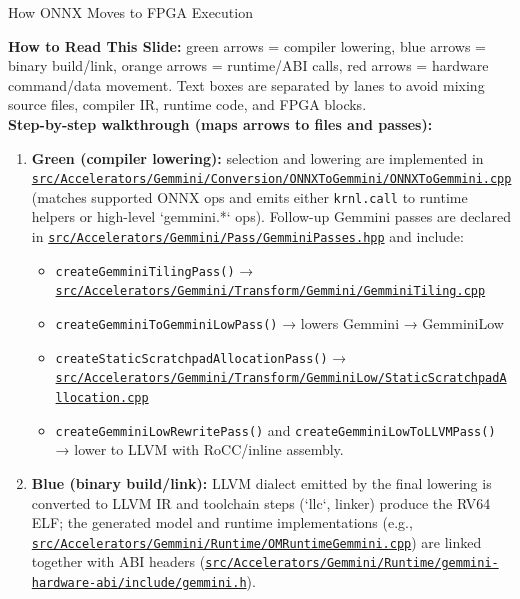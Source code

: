 \documentclass[aspectratio=169,10pt]{beamer}
\newcommand{\code}[1]{\texttt{\footnotesize #1}}
\newcommand{\tinycode}[1]{\texttt{\tiny #1}}
\newcommand{\repoRoot}{/home/lahcen/toolchains/onnx-mlir-xcompile/onnx-mlir}
\newcommand{\pathcode}[1]{\href{run:\repoRoot/#1}{\texttt{\scriptsize #1}}}
\begin{document}
\begin{frame}{How ONNX Moves to FPGA Execution}
{
  }
  \vfill
  \begin{minipage}{0.94\textwidth}
    {\tiny\color{codegray}\textbf{How to Read This Slide:}
    green arrows = compiler lowering, blue arrows = binary build/link, orange arrows = runtime/ABI calls, red arrows = hardware command/data movement.
    Text boxes are separated by lanes to avoid mixing source files, compiler IR, runtime code, and FPGA blocks.}
    \\[0.4em]
    {\scriptsize\textbf{Step-by-step walkthrough (maps arrows to files and passes):}}
    \vspace{0.15em}
    {\scriptsize\begin{enumerate}
      \item \textbf{Green (compiler lowering):} selection and lowering are implemented in
        \pathcode{src/Accelerators/Gemmini/Conversion/ONNXToGemmini/ONNXToGemmini.cpp} (matches supported ONNX ops and emits either \code{krnl.call} to runtime helpers or high-level `gemmini.*` ops). Follow-up Gemmini passes are declared in \pathcode{src/Accelerators/Gemmini/Pass/GemminiPasses.hpp} and include:
        \begin{itemize}\item \code{createGemminiTilingPass()} → \pathcode{src/Accelerators/Gemmini/Transform/Gemmini/GemminiTiling.cpp}
        \item \code{createGemminiToGemminiLowPass()} → lowers Gemmini → GemminiLow
        \item \code{createStaticScratchpadAllocationPass()} → \pathcode{src/Accelerators/Gemmini/Transform/GemminiLow/StaticScratchpadAllocation.cpp}
        \item \code{createGemminiLowRewritePass()} and \code{createGemminiLowToLLVMPass()} → lower to LLVM with RoCC/inline assembly.
        \end{itemize}
      \item \textbf{Blue (binary build/link):} LLVM dialect emitted by the final lowering is converted to LLVM IR and toolchain steps (`llc`, linker) produce the RV64 ELF; the generated model and runtime implementations (e.g., \pathcode{src/Accelerators/Gemmini/Runtime/OMRuntimeGemmini.cpp}) are linked together with ABI headers (\pathcode{src/Accelerators/Gemmini/Runtime/gemmini-hardware-abi/include/gemmini.h}).

\end{enumerate}}
\end{minipage}
\end{frame}
\end{document}
